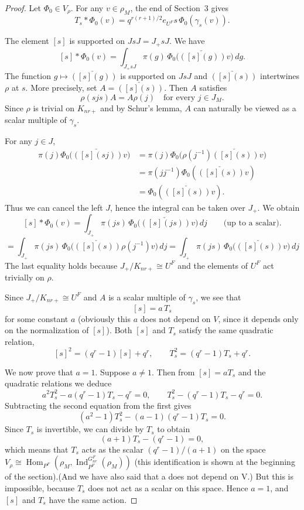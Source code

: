 \documentclass[12pt]{article}
\theoremstyle{remark}
\begin{document}
\begin{proof}
Let $\Phi_0 \in V_\rho$. For any $v \in \rho_M$, the end of Section~3 gives
$$
T_s * \Phi_0(v) = q^{r(r+1)/2} e_{U^F} s \, \Phi_0(\gamma_s(v)).
$$

The element $[s]$ is supported on $J s J = J_+ s J$. We have
$$
[s] * \Phi_0(v) = \int_{J_+ s J} \pi(g) \, \Phi_0\bigl( \check{([s](g))} v \bigr) \, dg.
$$
The function $g \mapsto \check{([s](g))}$ is supported on $J sJ$ and $\check{([s](s))}$ intertwines $\rho$ at $s$. More precisely, set $A = \check{([s](s))}$. Then $A$ satisfies
$$
\rho(s j s) A = A \rho(j) \quad \text{for every } j \in J_M.
$$
Since $\rho$ is trivial on $K_{nr+}$ and by Schur's lemma, $A$ can naturally be viewed as a scalar multiple of $\gamma_s$.

For any $j \in J$,
\begin{align*}
\pi(j) \Phi_0\bigl( \check{([s](sj))} v \bigr)
&=  \pi(j) \Phi_0\bigl( \rho(j^{-1}) \check{([s](s))} v \bigr) \\
&= \pi( j j^{-1}) \Phi_0( \check{([s](s))} v ) \\
&=  \Phi_0( \check{([s](s))} v ).
\end{align*}
Thus we can cancel the left $J$, hence the integral can be taken over $J_+$. We obtain
$$
[s] * \Phi_0(v) = \int_{J_+} \pi(js) \, \Phi_0\bigl( \check{([s](js))} v \bigr) \, dj \qquad \text{(up to a scalar)}.
$$
$$
= \int_{J_+} \pi(js) \, \Phi_0\bigl( \check{([s](s))}\rho(j^{-1}) v \bigr) \, dj = \int_{J_+} \pi(js) \, \Phi_0\bigl( \check{([s](s))} v \bigr) \, dj
$$
The last equality holds because $J_+/K_{nr+} \cong U^F$ and the elements of $U^F$ act trivially on $\rho$.

Since $J_+/K_{nr+} \cong U^F$ and $A$ is a scalar multiple of $\gamma_s$, we see that
$$
[s]  = a \, T_s
$$
for some constant $a$ (obviously this $a$ does not depend on $V$, since it depends only on the normalization of $[s]$).  Both $[s]$ and $T_s$ satisfy the same quadratic relation,
$$
[s]^2 = (q^r - 1)[s] + q^r, \qquad
T_s^2 = (q^r - 1) T_s + q^r.
$$

We now prove that $a=1$. Suppose $a \neq 1$. Then from $[s] = a T_s$ and the quadratic relations we deduce
$$
a^2 T_s^2 - a(q^r-1) T_s - q^r = 0, \qquad
T_s^2 - (q^r-1) T_s - q^r = 0.
$$
Subtracting the second equation from the first gives
$$
(a^2 - 1) T_s^2 - (a-1)(q^r-1) T_s = 0.
$$
Since $T_s$ is invertible, we can divide by $T_s$ to obtain
$$
(a+1) T_s - (q^r-1) = 0,
$$
which means that $T_s$ acts as the scalar $(q^r-1)/(a+1)$ on the space $V_\rho \cong \operatorname{Hom}_{P^F}(\rho_M, \operatorname{Ind}_{P^F}^{G_{nr}^F}(\rho_M))$ (this identification is shown at the beginning of the section).(And we have also said that a does not depend on V.) But this is impossible, because $T_s$ does not act as a scalar on this space. Hence $a = 1$, and $[s]$ and $T_s$ have the same action.
\end{proof}
\end{document}
